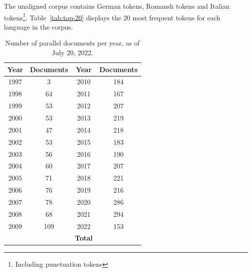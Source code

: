 The unaligned corpus contains  German tokens,  Romansh tokens and  Italian tokens\footnote{Including punctuation tokens}. Table~\ref{tab:top-20} displays the 20 most frequent tokens for each language in the corpus.

\begin{table}
\centering
\begin{tabular}{cc|cc}
\toprule
Year & Documents & Year & Documents\\
\midrule
1997 &	3 & 2010	&184\\
1998 & 64 & 2011	&167\\
1999 & 53 & 2012&	207 \\
2000 & 53 & 2013 &	219 \\
2001 &	47 &2014	&218\\
2002 & 53 &2015	&183 \\
2003 &	56 & 2016	&190\\
2004&	60 & 2017	&207\\
2005	&71 & 2018	&221 \\
2006	&76 & 2019	&216 \\
2007	&78 & 2020	&286 \\
2008	&68 & 2021	&294 \\
2009	&109&2022	&153\\
		
		\midrule
		&   & \textbf{Total} & \textbf{\numprint{3536}} \\
\bottomrule
\end{tabular}
\caption[Number of parallel documents per year]{Number of parallel documents per year, as of July 20, 2022.}
\label{tab:docs-per-year}
\end{table}

